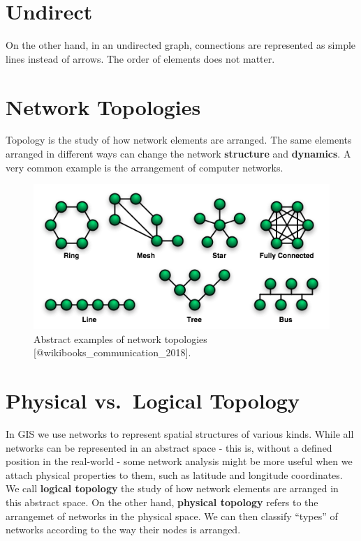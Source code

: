 \documentclass[
]{book}
\begin{document}
\section{Undirect}\label{undirect}

On the other hand, in an undirected graph, connections are represented as simple lines instead of arrows. The order of elements does not matter.

\section{Network Topologies}\label{network-topologies}

Topology is the study of how network elements are arranged. The same elements arranged in different ways can change the network \textbf{structure} and \textbf{dynamics}. A very common example is the arrangement of computer networks.

\begin{figure}
\includegraphics[width=0.8\linewidth]{images/08-network_topologies} \caption{Abstract examples of network topologies [@wikibooks_communication_2018].}\label{fig:8-network-topologies}
\end{figure}

\section{Physical vs.~Logical Topology}\label{physical-vs.-logical-topology}

In GIS we use networks to represent spatial structures of various kinds. While all networks can be represented in an abstract space - this is, without a defined position in the real-world - some network analysis might be more useful when we attach physical properties to them, such as latitude and longitude coordinates. We call \textbf{logical topology} the study of how network elements are arranged in this abstract space. On the other hand, \textbf{physical topology} refers to the arrangemet of networks in the physical space. We can then classify ``types'' of networks according to the way their nodes is arranged.
\end{document}

